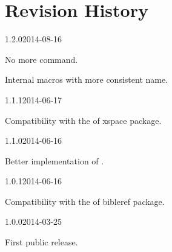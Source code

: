 \documentclass{ltxdockit}[2011/03/25]
\begin{document}
\section{Revision History}
\begin{changelog}


\begin{release}{1.2.0}{2014-08-16}
\item No more  command.
\item Internal macros with more consistent name.
\end{release}

\begin{release}{1.1.1}{2014-06-17}
\item Compatibility with the  of xspace package.
\end{release}


\begin{release}{1.1.0}{2014-06-16}
\item Better implementation of  .
\end{release}

\begin{release}{1.0.1}{2014-06-16}
\item Compatibility with the  of bibleref package.
\end{release}

\begin{release}{1.0.0}{2014-03-25}
\item First public release.
\end{release}

\end{changelog}
\end{document}
